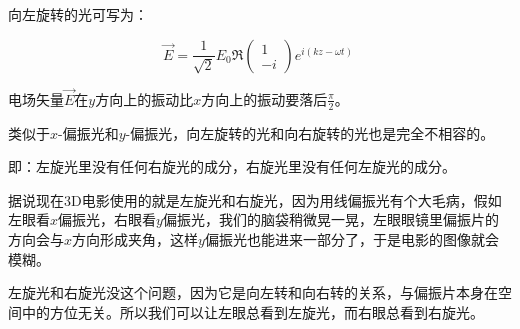 \begin{enumerate}
向左旋转的光可写为：

\begin{equation}
\vec E = \frac{1}{\sqrt{2}} E_0 \Re \left(
\begin{array}{c}
1 \\ - i
\end{array}
\right) e^{i (kz - \omega t)}~
\end{equation}

电场矢量$\vec E$在$y$方向上的振动比$x$方向上的振动要落后$\frac{\pi}{2}$。

类似于$x$-偏振光和$y$-偏振光，向左旋转的光和向右旋转的光也是完全不相容的。

即：左旋光里没有任何右旋光的成分，右旋光里没有任何左旋光的成分。

据说现在3D电影使用的就是左旋光和右旋光，因为用线偏振光有个大毛病，假如左眼看$x$偏振光，右眼看$y$偏振光，我们的脑袋稍微晃一晃，左眼眼镜里偏振片的方向会与$x$方向形成夹角，这样$y$偏振光也能进来一部分了，于是电影的图像就会模糊。

左旋光和右旋光没这个问题，因为它是向左转和向右转的关系，与偏振片本身在空间中的方位无关。所以我们可以让左眼总看到左旋光，而右眼总看到右旋光。

\end{enumerate}